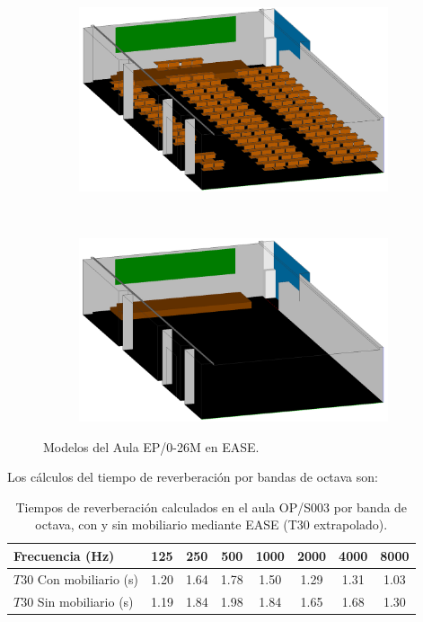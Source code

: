 \begin{figure}[ht]
    \centering
    \begin{subfigure}[b]{0.45\textwidth}
    	\centering
        \includegraphics[width=0.9\linewidth]{archivos/capturas/easeopllena.png}
    \end{subfigure}
    ~ %
    \begin{subfigure}[b]{0.45\textwidth}
    	\centering
        \includegraphics[width=0.9\linewidth]{archivos/capturas/easeopvacia.png}
    \end{subfigure}
    \caption{Modelos del Aula EP/0-26M en EASE.}\label{modeloopease}
\end{figure}
\FloatBarrier 

Los cálculos del tiempo de reverberación por bandas de octava son:

\begin{table}[ht]
\centering
{
\begin{tabular}{@{}lccccccc@{}}
\toprule
Frecuencia (Hz) & 125 & 250 & 500 & 1000 & 2000 & 4000 & 8000 \\ \midrule
$T30$ Con mobiliario (s) & 1.20 & 1.64 & 1.78 & 1.50 & 1.29 & 1.31 & 1.03 \\
$T30$ Sin mobiliario (s) & 1.19 & 1.84 & 1.98 & 1.84 & 1.65 & 1.68 & 1.30 \\ \bottomrule
\end{tabular}
}
\caption{Tiempos de reverberación calculados en el aula OP/S003 por banda de octava, con y sin mobiliario mediante EASE (T30 extrapolado).}
\label{tab:revopease}
\end{table}
\FloatBarrier

